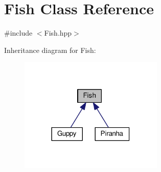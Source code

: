 \hypertarget{classFish}{}\section{Fish Class Reference}
\label{classFish}


{\ttfamily \#include $<$Fish.\+hpp$>$}



Inheritance diagram for Fish\+:\nopagebreak
\begin{figure}[H]
\begin{center}
\leavevmode
\includegraphics[width=194pt]{classFish__inherit__graph}
\end{center}
\end{figure}
